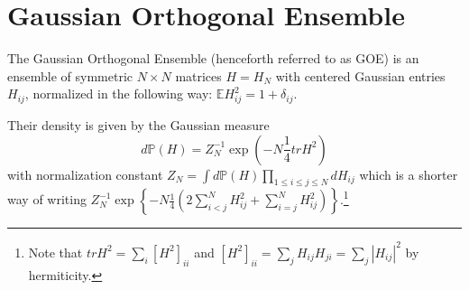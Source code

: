 \section{Gaussian Orthogonal Ensemble}
\begin{definition}\label{def:GOE}
	The Gaussian Orthogonal Ensemble (henceforth referred to as GOE) is an ensemble of symmetric $N\times N$ matrices $H=H_N$ with centered Gaussian entries $H_{ij}$, normalized in the following way: $\mathbb E H_{ij}^2=1+\delta_{ij}$.
\end{definition}
\begin{remark}
	Their density is given by the Gaussian measure
	\begin{equation}
		d\mathbb P(H)=Z_N^{-1}\exp\left(-N\frac{1}{4}tr H^2\right)
	\end{equation}
	with normalization constant $Z_N=\int d\mathbb P(H)\prod_{1\leq i\leq j\leq N} dH_{ij}$ which is a shorter way of writing $Z_N^{-1}\exp\left\{-N\frac{1}{4}\left(2\sum_{i<j}^N H_{ij}^2+\sum_{i=j}^N H_{ij}^2\right)\right\}$.\footnote{Note that $tr H^2 = \sum_i [H^2]_{ii}$ and $[H^2]_{ii}=\sum_j H_{ij}H_{ji}=\sum_j |H_{ij}|^2$ by hermiticity.}
\end{remark}

